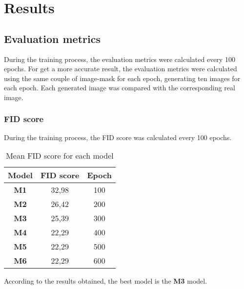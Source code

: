 \section{Results}
\label{sec:results}
\subsection{Evaluation metrics}
During the training process, the evaluation metrics were calculated every 100 epochs.
For get a more accurate result, the evaluation metrics were calculated using the same couple of image-mask for each epoch, generating ten images for each epoch.
Each generated image was compared with the corresponding real image.
\subsubsection{FID score}
During the training process, the FID score was calculated every 100 epochs. 
\begin{table}[H]
    \centering
    \begin{tabular}{|c|c|c|}
        \hline
        \textbf{Model} & \textbf{FID score} & \textbf{Epoch} \\
        \hline
        \hline
        \textbf{M1} & 32,98 & 100 \\
        \hline
        \textbf{M2} & 26,42 & 200 \\
        \hline
        \textbf{M3} & 25,39 & 300 \\
        \hline
        \textbf{M4} & 22,29 & 400 \\
        \hline
        \textbf{M5} & 22,29 & 500 \\
        \hline
        \textbf{M6} & 22,29 & 600 \\
    \end{tabular}
    \caption{Mean FID score for each model}
    \label{tab:fid-score}
\end{table}
According to the results obtained, the best model is the \textbf{M3} model.
